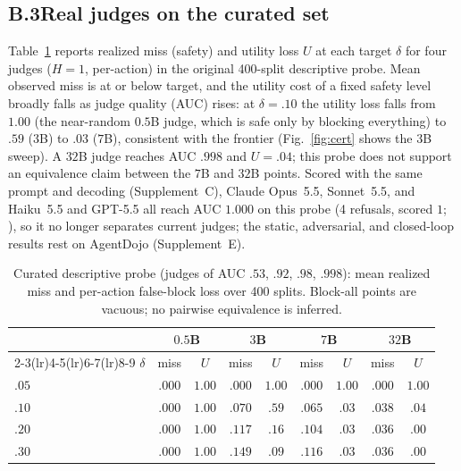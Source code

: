 \subsection*{B.3\quad Real judges on the curated set}
Table~\ref{tab:curated} reports realized miss (safety) and utility loss $U$ at
each target $\delta$ for four judges ($H=1$, per-action) in the original
400-split descriptive probe. Mean observed miss is at or below target, and
the utility cost of a fixed safety level broadly falls as
judge quality (AUC) rises: at $\delta=.10$ the utility loss falls from $1.00$
(the near-random $0.5$B judge, which is safe only by blocking everything) to
$.59$ ($3$B) to $.03$ ($7$B), consistent with the frontier (Fig.~\ref{fig:cert} shows the $3$B sweep). A $32$B judge
reaches AUC $.998$ and $U=.04$; this probe does not support an equivalence
claim between the $7$B and $32$B points. Scored with the same prompt and decoding (Supplement~C), Claude Opus~5.5, Sonnet~5.5, and
Haiku~5.5 and GPT-5.5 all reach AUC $1.000$ on this probe (4 refusals, scored $1$;
), so it no longer separates current judges; the static,
adversarial, and closed-loop results rest on AgentDojo (Supplement~E).

\begin{table}[t]
\caption{Curated descriptive probe (judges of AUC $.53$, $.92$, $.98$,
$.998$): mean realized miss and per-action false-block loss over 400 splits.
Block-all points are vacuous; no pairwise equivalence is inferred.}
\label{tab:curated}
\centering\small\setlength{\tabcolsep}{3pt}
\begin{tabular}{@{}lcccccccc@{}}
\toprule
& \multicolumn{2}{c}{$0.5$B} & \multicolumn{2}{c}{$3$B} & \multicolumn{2}{c}{$7$B} & \multicolumn{2}{c}{$32$B}\\
\cmidrule(lr){2-3}\cmidrule(lr){4-5}\cmidrule(lr){6-7}\cmidrule(lr){8-9}
$\delta$ & miss & $U$ & miss & $U$ & miss & $U$ & miss & $U$\\
\midrule
$.05$ & $.000$ & $1.00$ & $.000$ & $1.00$ & $.000$ & $1.00$ & $.000$ & $1.00$\\
$.10$ & $.000$ & $1.00$ & $.070$ & $.59$ & $.065$ & $.03$ & $.038$ & $.04$\\
$.20$ & $.000$ & $1.00$ & $.117$ & $.16$ & $.104$ & $.03$ & $.036$ & $.00$\\
$.30$ & $.000$ & $1.00$ & $.149$ & $.09$ & $.116$ & $.03$ & $.036$ & $.00$\\
\bottomrule
\end{tabular}
\end{table}

